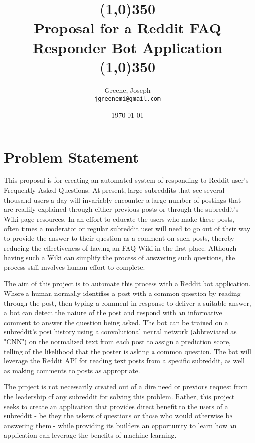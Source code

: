 \documentclass[dvips,11pt]{article}
\begin{document}
\title{\line(1,0){350}\\Proposal for a Reddit FAQ Responder Bot Application\\\line(1,0){350}}

\author{
Greene, Joseph \\
\texttt{jgreenemi@gmail.com}
}
\date{\today}

\maketitle


\section{Problem Statement}

This proposal is for creating an automated system of responding to Reddit user's Frequently Asked Questions. At present, large subreddits that see several thousand users a day will invariably encounter a large number of postings that are readily explained through either previous posts or through the subreddit's Wiki page resources. In an effort to educate the users who make these posts, often times a moderator or regular subreddit user will need to go out of their way to provide the answer to their question as a comment on such posts, thereby reducing the effectiveness of having an FAQ Wiki in the first place. Although having such a Wiki can simplify the process of answering such questions, the process still involves human effort to complete.

The aim of this project is to automate this process with a Reddit bot application. Where a human normally identifies a post with a common question by reading through the post, then typing a comment in response to deliver a suitable answer, a bot can detect the nature of the post and respond with an informative comment to answer the question being asked. The bot can be trained on a subreddit's post history using a convolutional neural network (abbreviated as "CNN") on the normalized text from each post to assign a prediction score, telling of the likelihood that the poster is asking a common question. The bot will leverage the Reddit API for reading text posts from a specific subreddit, as well as making comments to posts as appropriate.

The project is not necessarily created out of a dire need or previous request from the leadership of any subreddit for solving this problem. Rather, this project seeks to create an application that provides direct benefit to the users of a subreddit - be they the askers of questions or those who would otherwise be answering them - while providing its builders an opportunity to learn how an application can leverage the benefits of machine learning.
\end{document}
